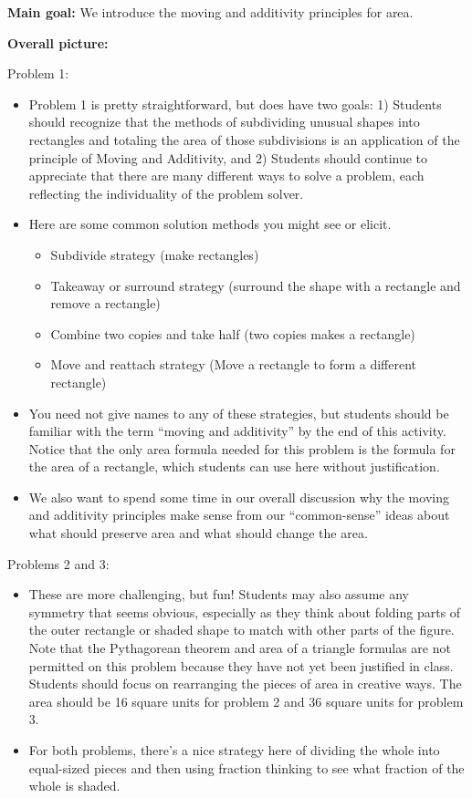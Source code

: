 \documentclass[noauthor,nooutcomes, handout]{ximera}
\begin{document}
\begin{instructorNotes}
{\bf Main goal:} We introduce the moving and additivity principles for area.

{\bf Overall picture:} 

Problem 1:
\begin{itemize}
\item Problem 1 is pretty straightforward, but does have two goals: 1) Students should recognize that the methods of subdividing unusual shapes into rectangles and totaling the area of those subdivisions is an application of the principle of Moving and Additivity, and 2) Students should continue to appreciate that there are many different ways to solve a problem, each reflecting the individuality of the problem solver.

\item Here are some common solution methods you might see or elicit.
\begin{itemize}
    \item Subdivide strategy (make rectangles)
    \item Takeaway or surround strategy (surround the shape with a rectangle and remove a rectangle)
    \item Combine two copies and take half (two copies makes a rectangle)
    \item Move and reattach strategy (Move a rectangle to form a different rectangle)
\end{itemize}

\item You need not give names to any of these strategies, but students should be familiar with the term ``moving and additivity'' by the end of this activity.  Notice that the only area formula needed for this problem is the formula for the area of a rectangle, which students can use here without justification.
\item We also want to spend some time in our overall discussion why the moving and additivity principles make sense from our ``common-sense'' ideas about what should preserve area and what should change the area.
\end{itemize}

Problems 2 and 3:
\begin{itemize}
\item These are more challenging, but fun!   Students may also assume any symmetry that seems obvious, especially as they think about folding parts of the outer rectangle or shaded shape to match with other parts of the figure. Note that the Pythagorean theorem and area of a triangle formulas are not permitted on this problem because they have not yet been justified in class. Students should focus on rearranging the pieces of area in creative ways. The area should be 16 square units for problem 2 and 36 square units for problem 3. 
\item For both problems, there's a nice strategy here of dividing the whole into equal-sized pieces and then using fraction thinking to see what fraction of the whole is shaded.
\end{itemize}



\end{instructorNotes}
\end{document}
